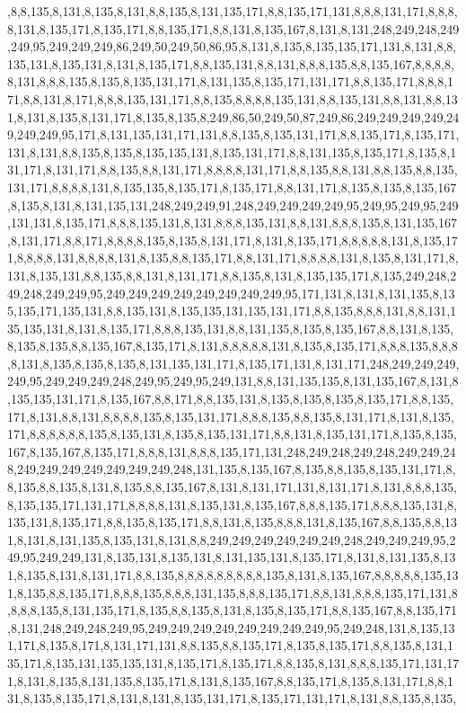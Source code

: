 ,8,8,135,8,131,8,135,8,131,8,8,135,8,131,135,171,8,8,135,171,131,8,8,8,131,171,8,8,8,8,131,8,135,171,8,135,171,8,8,135,171,8,8,131,8,135,167,8,131,8,131,248,249,248,249,249,95,249,249,249,86,249,50,249,50,86,95,8,131,8,135,8,135,135,171,131,8,131,8,8,135,131,8,135,131,8,131,8,135,171,8,8,135,131,8,8,131,8,8,8,135,8,8,135,167,8,8,8,8,8,131,8,8,8,135,8,135,8,135,131,171,8,131,135,8,135,171,131,171,8,8,135,171,8,8,8,171,8,8,131,8,171,8,8,8,135,131,171,8,8,135,8,8,8,8,135,131,8,8,135,131,8,8,131,8,8,131,8,131,8,135,8,131,171,8,135,8,135,8,249,86,50,249,50,87,249,86,249,249,249,249,249,249,249,95,171,8,131,135,131,171,131,8,8,135,8,135,131,171,8,8,135,171,8,135,171,131,8,131,8,8,135,8,135,8,135,135,131,8,135,131,171,8,8,131,135,8,135,171,8,135,8,131,171,8,131,171,8,8,135,8,8,131,171,8,8,8,8,131,171,8,8,135,8,8,131,8,8,135,8,8,135,131,171,8,8,8,8,131,8,135,135,8,135,171,8,135,171,8,8,131,171,8,135,8,135,8,135,167,8,135,8,131,8,131,135,131,248,249,249,91,248,249,249,249,249,95,249,95,249,95,249,131,131,8,135,171,8,8,8,135,131,8,131,8,8,8,135,131,8,8,131,8,8,8,135,8,131,135,167,8,131,171,8,8,171,8,8,8,8,135,8,135,8,131,171,8,131,8,135,171,8,8,8,8,8,131,8,135,171,8,8,8,8,131,8,8,8,8,131,8,135,8,8,135,171,8,8,131,171,8,8,8,8,131,8,135,8,131,171,8,131,8,135,131,8,8,135,8,8,131,8,131,171,8,8,135,8,131,8,135,135,171,8,135,249,248,249,248,249,249,95,249,249,249,249,249,249,249,249,95,171,131,8,131,8,131,135,8,135,135,171,135,131,8,8,135,131,8,135,135,131,135,131,171,8,8,135,8,8,8,131,8,8,131,135,135,131,8,131,8,135,171,8,8,8,135,131,8,8,131,135,8,135,8,135,167,8,8,131,8,135,8,135,8,135,8,8,135,167,8,135,171,8,131,8,8,8,8,8,131,8,135,8,135,171,8,8,8,135,8,8,8,8,131,8,135,8,135,8,135,8,131,135,131,171,8,135,171,131,8,131,171,248,249,249,249,249,95,249,249,249,248,249,95,249,95,249,131,8,8,131,135,135,8,131,135,167,8,131,8,135,135,131,171,8,135,167,8,8,171,8,8,135,131,8,135,8,135,8,135,8,135,171,8,8,135,171,8,131,8,8,131,8,8,8,8,135,8,135,131,171,8,8,8,135,8,8,135,8,131,171,8,131,8,135,171,8,8,8,8,8,8,135,8,135,131,8,135,8,135,131,171,8,8,131,8,135,131,171,8,135,8,135,167,8,135,167,8,135,171,8,8,8,131,8,8,8,135,171,131,248,249,248,249,248,249,249,248,249,249,249,249,249,249,249,248,131,135,8,135,167,8,135,8,8,135,8,135,131,171,8,8,135,8,8,135,8,131,8,135,8,8,135,167,8,131,8,131,171,131,8,131,171,8,131,8,8,8,135,8,135,135,171,131,171,8,8,8,8,131,8,135,131,8,135,167,8,8,8,135,171,8,8,8,135,131,8,135,131,8,135,171,8,8,135,8,135,171,8,8,131,8,135,8,8,8,131,8,135,167,8,8,135,8,8,131,8,131,8,131,135,8,135,131,8,131,8,8,249,249,249,249,249,249,248,249,249,249,95,249,95,249,249,131,8,135,131,8,135,131,8,131,135,131,8,135,171,8,131,8,131,135,8,131,8,135,8,131,8,131,171,8,8,135,8,8,8,8,8,8,8,8,8,135,8,131,8,135,167,8,8,8,8,8,135,131,8,135,8,8,135,171,8,8,8,135,8,8,8,131,135,8,8,8,135,171,8,8,131,8,8,8,135,171,131,8,8,8,8,135,8,131,135,171,8,135,8,8,135,8,131,8,135,8,135,171,8,8,135,167,8,8,135,171,8,131,248,249,248,249,95,249,249,249,249,249,249,249,249,95,249,248,131,8,135,131,171,8,135,8,171,8,131,171,131,8,8,135,8,8,135,171,8,135,8,135,171,8,8,135,8,131,135,171,8,135,131,135,135,131,8,135,171,8,135,171,8,8,135,8,131,8,8,8,135,171,131,171,8,131,8,135,8,131,135,8,135,171,8,131,8,135,167,8,8,135,171,8,135,8,131,171,8,8,131,8,135,8,135,171,8,131,8,131,8,135,131,171,8,135,171,131,171,8,131,8,8,135,8,135,
